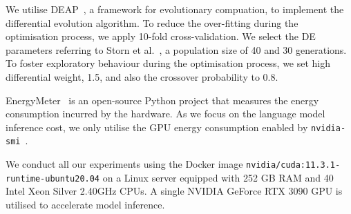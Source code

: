 We utilise DEAP~\cite{DEAP_JMLR2012}, a framework for evolutionary compuation, to implement the differential evolution algorithm. To reduce the over-fitting during the optimisation process, we apply 10-fold cross-validation. We select the DE parameters referring to Storn et al.~\cite{stornUsageDifferentialEvolution1996}, a population size of 40 and 30 generations. To foster exploratory behaviour during the optimisation process, we set high differential weight, 1.5, and also the crossover probability to 0.8.

EnergyMeter~\cite{argerichMeasuringImprovingEnergy2024} is an open-source Python project that measures the energy consumption incurred by the hardware. As we focus on the language model inference cost, we only utilise the GPU energy consumption enabled by \texttt{nvidia-smi}~\cite{developer2021nvidia}.

We conduct all our experiments using the Docker image \texttt{nvidia/cuda:11.3.1-runtime-ubuntu20.04} on a Linux server equipped with 252 GB RAM and 40 Intel Xeon Silver 2.40GHz CPUs. A single NVIDIA GeForce RTX 3090 GPU is utilised to accelerate model inference.
